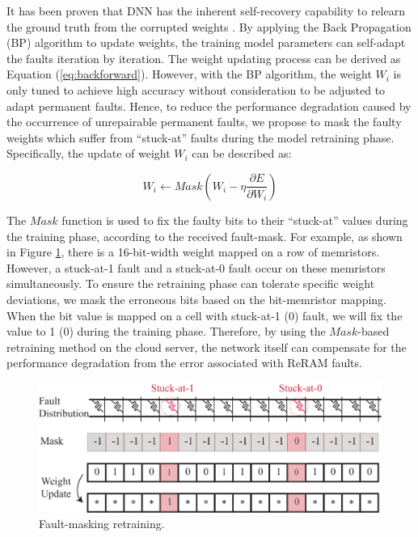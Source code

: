 It has been proven that DNN has the inherent self-recovery capability to relearn the ground truth from the corrupted weights \cite{8013784}.  By applying the Back Propagation (BP) algorithm to update weights, the training model parameters can self-adapt the faults iteration by iteration. The weight updating process can be derived as Equation (\ref{eq:backforward}). However, with the BP algorithm, the weight $ {W_{i}}$ is only tuned to achieve high accuracy without consideration to be adjusted to adapt permanent faults. Hence, to reduce the performance degradation caused by the occurrence of unrepairable permanent faults, we propose to mask the faulty weights which suffer from ``stuck-at'' faults during the model retraining phase. Specifically, the update of weight ${W_i}$ can be described as:
                                                                            
\begin{equation} 
    {W_{i}} \leftarrow Mask({W_{i}} - \eta \frac{{\partial E}}{{\partial {W_{i}}}})
\end{equation}
                                                                                                        
The $Mask$ function is used to fix the faulty bits to their “stuck-at” values during the training phase, according to the received fault-mask. For example, as shown in Figure \ref{fig:faultmask}, there is a 16-bit-width weight mapped on a row of memristors. However, a stuck-at-1 fault and a stuck-at-0 fault occur on these memristors simultaneously. To ensure the retraining phase can tolerate specific weight deviations, we mask the erroneous bits based on the bit-memristor mapping. When the bit value is mapped on a cell with stuck-at-1 (0) fault, we will fix the value to 1 (0) during the training phase. Therefore, by using the $Mask$-based retraining method on the cloud server, the network itself can compensate for the performance degradation from the error associated with ReRAM faults.
                                                                                                                        
\begin{figure}                                                                                                         
    \centering
    \includegraphics[width=0.75\linewidth]{images/OL-fig7}
    \caption{Fault-masking retraining.}
    \label{fig:faultmask} 
    \vspace {-15pt}
\end{figure}
                                                                                                                                                                                
